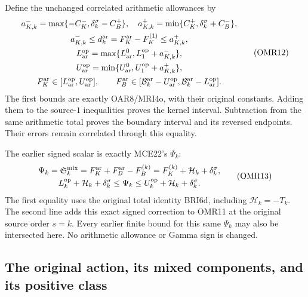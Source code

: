\documentclass[11pt,a4paper]{article}
\begin{document}
Define the unchanged correlated arithmetic allowances by
\[
 \begin{gathered}
 a_{K,k}^-=\max\{-C_K^-,\delta_k^\sigma-C_B^+\},\quad
 a_{K,k}^+=\min\{C_K^+,\delta_k^\sigma+C_B^-\},\\
 a_{K,k}^-\le d_k^{\rm ar}=F_K^{\rm ar}-F_K^{(1)}
                                      \le a_{K,k}^+,\\
 L_{\rm ar}^{\rm op}=\max\{L_{\rm ar}^0,L_1^{\rm op}+a_{K,k}^-\},\\
 U_{\rm ar}^{\rm op}=\min\{U_{\rm ar}^0,U_1^{\rm op}+a_{K,k}^+\},\\
 F_K^{\rm ar}\in[L_{\rm ar}^{\rm op},U_{\rm ar}^{\rm op}],\qquad
 F_B^{\rm ar}\in[\mathcal B_k^{\rm ar}-U_{\rm ar}^{\rm op},
                 \mathcal B_k^{\rm ar}-L_{\rm ar}^{\rm op}].
 \end{gathered}\tag{OMR12}
\]
The first bounds are exactly OAR8/MRI4o, with their original
constants. Adding them to the source-$1$ inequalities proves the
kernel interval. Subtraction from the same arithmetic total proves
the boundary interval and its reversed endpoints. Their errors
remain correlated through this equality.

The earlier signed scalar is exactly MCE22's $\Psi_k$:
\[
 \begin{gathered}
 \Psi_k=\mathfrak S_k^{\rm mix}
      =F_K^{\rm ar}+F_B^{\rm ar}-F_B^{(k)}
      =F_K^{(k)}+\mathcal H_k+\delta_k^\sigma,\\
 L_k^{\rm op}+\mathcal H_k+\delta_k^\sigma
 \le\Psi_k\le
 U_k^{\rm op}+\mathcal H_k+\delta_k^\sigma.
 \end{gathered}\tag{OMR13}
\]
The first equality uses the original total identity BRI6d, including
$\mathcal H_k=-T_k$. The second line adds this exact signed correction
to OMR11 at the original source order $s=k$. Every earlier finite
bound for this same $\Psi_k$ may also be intersected here. No
arithmetic allowance or Gamma sign is changed.

\subsection{The original action, its mixed components, and its positive class}
\end{document}
